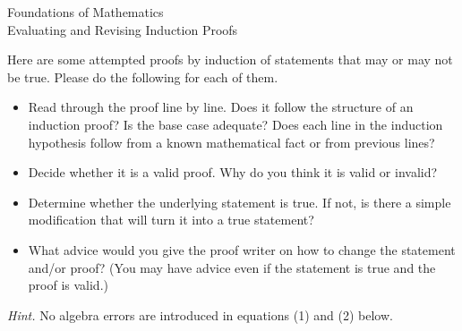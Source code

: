 \documentclass[12pt,letterpaper]{report}
\begin{document}
\begin{center}
Foundations of Mathematics \\
Evaluating and Revising Induction Proofs\\
\end{center}

Here are some attempted proofs by induction of statements that may or may not be true.
Please do the following for each of them.
\begin{itemize}
\item  Read through the proof line by line.  Does it follow the structure of an induction proof?  Is the base case adequate?  Does each line in the induction hypothesis follow from a known mathematical fact or from previous lines?
\item  Decide whether it is a valid proof.  Why do you think it is valid or invalid?
\item  Determine whether the underlying statement is true.  If not, is there a simple modification that will turn it into a true statement?
\item  What advice would you give the proof writer on how to change the statement and/or proof?
(You may have advice even if the statement is true and the proof is valid.)
\end{itemize}

{\it Hint.}  No algebra errors are introduced in equations (1) and (2) below.

\bigskip
\end{document}
